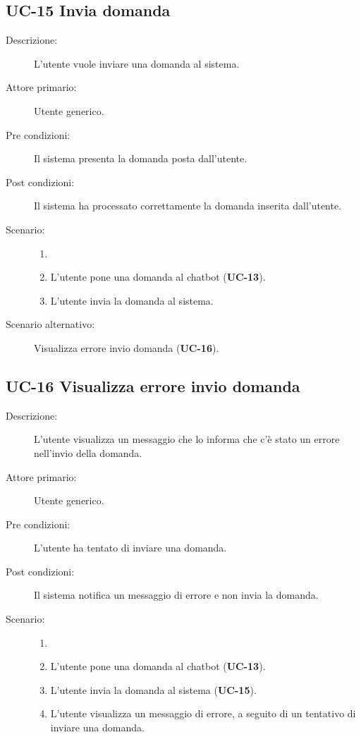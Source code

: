 \subsection{UC-15 Invia domanda}
\begin{description}
    \item[Descrizione:] L'utente vuole inviare una domanda al sistema.
    \item[Attore primario:] Utente generico.
    \item[Pre condizioni:] Il sistema presenta la domanda posta dall'utente.
    \item[Post condizioni:] Il sistema ha processato correttamente la domanda inserita dall'utente.
    \item[Scenario:]
    \begin{enumerate}
        \item[]
        \item L’utente pone una domanda al chatbot (\textbf{UC-13}).
        \item L'utente invia la domanda al sistema.
    \end{enumerate}
    \item[Scenario alternativo:] Visualizza errore invio domanda (\textbf{UC-16}).
\end{description}

\subsection{UC-16 Visualizza errore invio domanda}
\begin{description}
    \item[Descrizione:] L'utente visualizza un messaggio che lo informa che c'è stato un errore nell'invio della domanda.
    \item[Attore primario:] Utente generico.
    \item[Pre condizioni:] L'utente ha tentato di inviare una domanda.
    \item[Post condizioni:] Il sistema notifica un messaggio di errore e non invia la domanda.
    \item[Scenario:] 
    \begin{enumerate}
        \item[]
        \item L’utente pone una domanda al chatbot (\textbf{UC-13}).
        \item L'utente invia la domanda al sistema (\textbf{UC-15}).
        \item L'utente visualizza un messaggio di errore, a seguito di un tentativo di inviare una domanda.
    \end{enumerate}
\end{description}

